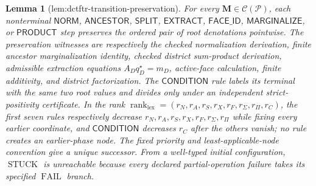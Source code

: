 \documentclass{article}
\newtheorem{lemma}{Lemma}
\begin{document}
\begin{lemma}[lem:dctftr-transition-preservation]\label{lem:dctftr-transition-preservation}
For every \(\mathbf M\in\mathcal C(\mathcal P)\), each nonterminal \(\mathsf{NORM}\), \(\mathsf{ANCESTOR}\), \(\mathsf{SPLIT}\), \(\mathsf{EXTRACT}\), \(\mathsf{FACE\_ID}\), \(\mathsf{MARGINALIZE}\), or \(\mathsf{PRODUCT}\) step preserves the ordered pair of root denotations pointwise. The preservation witnesses are respectively the checked normalization derivation, finite ancestor marginalization identity, checked district sum-product derivation, admissible extraction equations \(A_Dq_D^\star=m_D\), active-face calculation, finite additivity, and district factorization. The \(\mathsf{CONDITION}\) rule labels its terminal with the same two root values and divides only under an independent strict-positivity certificate. In the rank \(\operatorname{rank}_{\mathrm{lex}}=(r_N,r_A,r_S,r_X,r_F,r_{\Sigma},r_{\Pi},r_C)\), the first seven rules respectively decrease \(r_N,r_A,r_S,r_X,r_F,r_{\Sigma},r_{\Pi}\) while fixing every earlier coordinate, and \(\mathsf{CONDITION}\) decreases \(r_C\) after the others vanish; no rule creates an earlier-phase node. The fixed priority and least-applicable-node convention give a unique successor. From a well-typed initial configuration, \(\operatorname{STUCK}\) is unreachable because every declared partial-operation failure takes its specified \(\operatorname{FAIL}\) branch.
\end{lemma}
\end{document}
